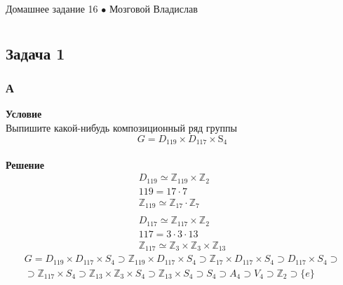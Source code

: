 \newpage
	{\large \hspace{3cm} \begin{center} Домашнее задание 16 $\bullet$ Мозговой Владислав \end{center} }
	\vspace{-1.5ex}
	\hrulefill
	
	\fontsize{12pt}{4.5mm}\selectfont
	\vspace{-3ex}
	\hrulefill
	\newline

	\section{}
		\subsection*{\textbf{Задача 1}}
			\subsubsection*{\textbf{А}}
			\textbf{Условие}\\
			Выпишите какой-нибудь композиционный ряд группы
			\begin{equation*}
				G=D_{119} \times D_{117} \times \mathrm{S}_{4}
			\end{equation*}
			\\
			\textbf{Решение}\\
			\begin{gather*}
				D_{119} \simeq \mathbb{Z}_{119} \times \mathbb{Z}_{2}\\
				119 = 17 \cdot 7\\
				\mathbb{Z}_{119} \simeq \mathbb{Z}_{17} \cdot \mathbb{Z}_{7}\\
				\\
				D_{117} \simeq \mathbb{Z}_{117} \times \mathbb{Z}_{2}\\
				117 = 3 \cdot 3 \cdot 13\\
				\mathbb{Z}_{117} \simeq \mathbb{Z}_{3} \times \mathbb{Z}_{3} \times \mathbb{Z}_{13}
			\end{gather*}
			\begin{gather*}
				G = D_{119} \times D_{117} \times S_{4} \supset \mathbb{Z}_{119} \times D_{117} \times S_{4} \supset \mathbb{Z}_{17} \times D_{117} \times S_{4} \supset D_{117} \times S_{4} \supset\\
				\supset \mathbb{Z}_{117} \times S_{4} \supset \mathbb{Z}_{13} \times \mathbb{Z}_{3} \times S_{4} \supset \mathbb{Z}_{13} \times S_{4} \supset S_{4}  \supset A_{4} \supset V_{4} \supset \mathbb{Z}_{2} \supset \{e\}
			\end{gather*}
			
